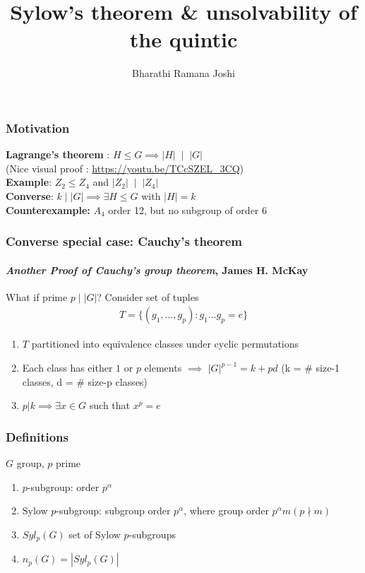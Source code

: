 \documentclass{beamer}
\title{Sylow's theorem \& unsolvability of the quintic}
\author{Bharathi Ramana Joshi}
\begin{document}
\maketitle
\begin{frame}
    \frametitle{Motivation}
    \textbf{Lagrange's theorem} : $H\leq G\implies |H|\;\mid\;|G|$\\
    (Nice visual proof : \url{https://youtu.be/TCcSZEL_3CQ})\\
    \textbf{Example}: $Z_2\leq Z_4$ and $|Z_2|\;\mid\;|Z_4|$\\
    \vspace{20pt}
    \textbf{Converse}: $k\mid|G|\implies\exists H\leq G$ with $|H| = k$\\
    \textbf{Counterexample:} $A_4$ order 12, but no subgroup of order 6
\end{frame}

\begin{frame}
    \frametitle{Converse special case: Cauchy's theorem}
    \framesubtitle{\textit{Another Proof of Cauchy’s group theorem}, James H. McKay}
    What if prime $p\mid|G|$?
    Consider set of tuples
    \begin{gather*}
        T = \{(g_1,\dots,g_p):g_1\dots g_p = e\}
    \end{gather*}
    \begin{enumerate}
        \item $T$ partitioned into equivalence classes under cyclic permutations
        \item Each class has either $1$ or $p$ elements $\implies$ $|G|^{p-1} =
            k+pd$ (k = \# size-1 classes, d = \# size-p classes)
        \item $p|k\implies\exists x\in G$ such that $x^p = e$
    \end{enumerate}
\end{frame}

\begin{frame}
    \frametitle{Definitions}
    $G$ group, $p$ prime
    \begin{enumerate}
        \item $p$-subgroup: order $p^\alpha$
        \item Sylow $p$-subgroup: subgroup order $p^\alpha$, where group order
            $p^\alpha m (p\nmid m)$
        \item $Syl_p(G)$ set of Sylow $p$-subgroups
        \item $n_p(G) = |Syl_p(G)|$
    \end{enumerate}
\end{frame}
\end{document}
